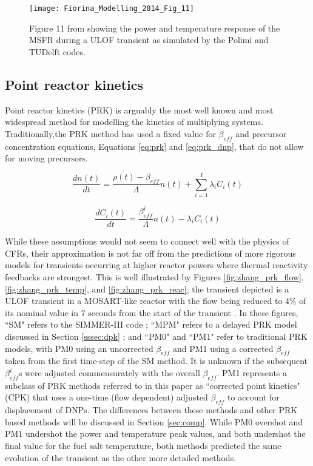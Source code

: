 \documentclass[review]{elsarticle}
\begin{document}
\begin{figure}[H]
   \centering
   \texttt{[image: Fiorina\_Modelling\_2014\_Fig\_11]}
   \caption{Figure 11 from \cite{fiorina_modelling_2014} showing the power and temperature
   response of the MSFR during a ULOF transient as simulated by the Polimi and TUDelft codes.} 
   \label{fig:fiorina_msfr_ulof}
\end{figure}

\subsection{Point reactor kinetics} \label{ssec:prk}
Point reactor kinetics (PRK) is arguably the most well known and most widespread
method for modelling the kinetics of multiplying systems. Traditionally,the PRK
method has used a fixed value for $\beta_{eff}$ and precursor concentration
equations, Equations \ref{eq:prk} and \ref{eq:prk_dnp}, 
that do not allow for moving precursors.

\begin{equation}
    \label{eq:prk}
    \frac{dn(t)}{dt} = \frac{\rho(t) - \beta_{eff}}{\Lambda} n(t) +
     \sum_{i = 1}^{I} \lambda_{i} C_{i}(t)
\end{equation}

\begin{equation}
    \label{eq:prk_dnp}
    \frac{dC_{i}(t)}{dt} = \frac{\beta_{eff}^{i}}{\Lambda} n(t) -
        \lambda_{i} C_{i}(t)
\end{equation}

While these assumptions would not seem to connect well
with the physics of CFRs, their approximation is not far off from the
predictions of more rigorous models for transients occurring at higher
reactor powers where thermal reactivity feedbacks are strongest.
This is well illustrated by Figures
\ref{fig:zhang_prk_flow}, \ref{fig:zhang_prk_temp}, and 
\ref{fig:zhang_prk_reac};
the transient depicted is a ULOF transient in a MOSART-like reactor with the
flow being reduced to 4\% of its nominal value in 7 seconds from the start
of the transient \cite{zhang_comparison_2009}. In these figures,
``SM" refers to the SIMMER-III code \cite{rineiski_kinetics_2005};
``MPM" refers to a delayed PRK model discussed in Section \ref{sssec:dpk} \cite{suzuki_reactivity-initiated-accident_2008};
and ``PM0" and ``PM1" refer to traditional PRK models, with PM0 using an
uncorrected $\beta_{eff}$ and PM1 using a corrected $\beta_{eff}$ taken from
the first time-step of the SM method. It is unknown if the subsequent
$\beta_{eff}^{i}$s were adjusted commensurately with the overall $\beta_{eff}$.
PM1 represents a subclass of PRK methods referred to in this paper as
``corrected point kinetics" (CPK) that uses a one-time (flow dependent) adjusted $\beta_{eff}$ to account for
displacement of DNPs.
The differences between these methods and other 
PRK based methods will be discussed in Section \ref{sec:comp}.
While PM0 overshot and PM1 undershot the power and temperature peak values, and
both undershot the final value for the fuel salt temperature, both methods
predicted the same evolution of the transient as the other more detailed
methods.
\end{document}
